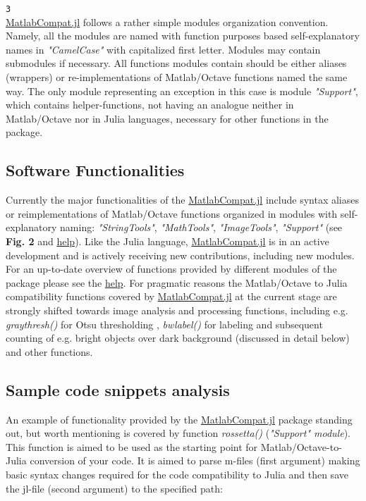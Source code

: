 \verb|3|\\


\href{https://github.com/MatlabCompat/MatlabCompat.jl}{MatlabCompat.jl} follows a rather simple modules organization convention. Namely, all the modules are named with function purposes based self-explanatory names in \textit{"CamelCase"} with capitalized first letter. Modules may contain submodules if necessary. All functions modules contain should be either aliases (wrappers) or re-implementations of Matlab/Octave functions named the same way. The only module representing an exception in this case is module \textit{"Support"}, which contains helper-functions, not having an analogue neither in Matlab/Octave nor in Julia languages, necessary for other functions in the package.

\subsection{Software Functionalities}

Currently the major functionalities of the \href{https://github.com/MatlabCompat/MatlabCompat.jl}{MatlabCompat.jl} include syntax aliases or reimplementations of Matlab/Octave functions organized in modules with self-explanatory naming: \textit{"StringTools"}, \textit{"MathTools"}, \textit{"ImageTools"}, \textit{"Support"} (see \textbf{Fig. 2} and \href{http://matlabcompat.github.io/help.html}{help}). Like the Julia language, \href{https://github.com/MatlabCompat/MatlabCompat.jl}{MatlabCompat.jl} is in an active development and is actively receiving new contributions, including new modules. For an up-to-date overview of functions provided by different modules of the package please see the \href{http://matlabcompat.github.io/help.html}{help}. For pragmatic reasons the Matlab/Octave to Julia compatibility functions covered by \href{https://github.com/MatlabCompat/MatlabCompat.jl}{MatlabCompat.jl} at the current stage are strongly shifted towards image analysis and processing functions, including e.g. \textit{graythresh()} for Otsu thresholding \cite{otsu1975threshold}, \textit{bwlabel()} for labeling and subsequent counting of e.g. bright objects over dark background (discussed in detail below) and other functions.

\subsection{Sample code snippets analysis}

An example of functionality provided by the \href{https://github.com/MatlabCompat/MatlabCompat.jl}{MatlabCompat.jl} package standing out, but worth mentioning is covered by function \textit{rossetta()} (\textit{"Support" module}). This function is aimed to be used as the starting point for Matlab/Octave-to-Julia conversion of your code. It is aimed to parse m-files (first argument) making basic syntax changes required for the code compatibility to Julia and then save the jl-file (second argument) to the specified path:\\

